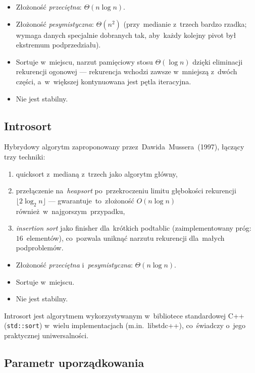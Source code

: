 \documentclass[11pt,a4paper]{article}
\begin{document}
\begin{itemize}[nosep]
  \item Złożoność \emph{przeciętna}: $\Theta(n\log n)$.
  \item Złożoność \emph{pesymistyczna}: $\Theta(n^2)$ (przy~medianie z~trzech bardzo rzadka;
  wymaga danych specjalnie dobranych tak, aby~każdy kolejny pivot był ekstremum podprzedziału).
  \item Sortuje w~miejscu, narzut pamięciowy stosu $\Theta(\log n)$ dzięki eliminacji
  rekurencji ogonowej — rekurencja wchodzi zawsze w~mniejszą z~dwóch części, a~w~większej
  kontynuowana jest pętla iteracyjna.
  \item Nie jest stabilny.
\end{itemize}

\subsection{Introsort}

Hybrydowy algorytm zaproponowany przez~Dawida~Mussera~(1997), łączący trzy techniki:
\begin{enumerate}[nosep]
  \item quicksort z~medianą z~trzech jako algorytm główny,
  \item przełączenie na~\emph{heapsort} po~przekroczeniu limitu głębokości rekurencji
  $\lfloor 2\log_2 n \rfloor$ --- gwarantuje~to~złożoność $O(n\log n)$ również~w~najgorszym~przypadku,
  \item \emph{insertion sort} jako finisher dla~krótkich podtablic (zaimplementowany próg:
  $16$~elementów), co~pozwala uniknąć narzutu rekurencji dla~małych podproblemów.
\end{enumerate}

\begin{itemize}[nosep]
  \item Złożoność \emph{przeciętna} i~\emph{pesymistyczna}: $\Theta(n\log n)$.
  \item Sortuje w~miejscu.
  \item Nie jest stabilny.
\end{itemize}

Introsort jest algorytmem wykorzystywanym w~bibliotece standardowej C++ (\texttt{std::sort})
w~wielu implementacjach (m.in.~libstdc++), co~świadczy o~jego praktycznej uniwersalności.

\subsection{Parametr uporządkowania}
\end{document}
